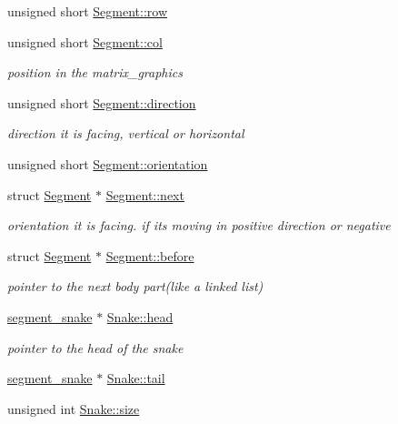 \begin{DoxyCompactItemize}
\item 
unsigned short \hyperlink{group__snake_ga5c86edfec316ae4d5033a85525babed6}{Segment\+::row}
\item 
unsigned short \hyperlink{group__snake_ga3369387554e0ec37bb04c153c3529ed9}{Segment\+::col}
\begin{DoxyCompactList}\small\item\em position in the matrix\+\_\+graphics \end{DoxyCompactList}\item 
unsigned short \hyperlink{group__snake_gacf610091b7f59fb0f1f37c6df4e14c18}{Segment\+::direction}
\begin{DoxyCompactList}\small\item\em direction it is facing, vertical or horizontal \end{DoxyCompactList}\item 
unsigned short \hyperlink{group__snake_gadd6c62d3fd2c3aab9175c07694fdc075}{Segment\+::orientation}
\item 
struct \hyperlink{structSegment}{Segment} $\ast$ \hyperlink{group__snake_ga20fb1741f720a656ec35972c2305a2d9}{Segment\+::next}
\begin{DoxyCompactList}\small\item\em orientation it is facing. if its moving in positive direction or negative \end{DoxyCompactList}\item 
struct \hyperlink{structSegment}{Segment} $\ast$ \hyperlink{group__snake_ga60c4d032ff0baffc3c99c1630dae24e3}{Segment\+::before}
\begin{DoxyCompactList}\small\item\em pointer to the next body part(like a linked list) \end{DoxyCompactList}\item 
\hyperlink{group__snake_ga40f634d31a1f9372bd182d65da207a21}{segment\+\_\+snake} $\ast$ \hyperlink{group__snake_gaf63e50ac65f365d67ae3975a178cba8c}{Snake\+::head}
\begin{DoxyCompactList}\small\item\em pointer to the head of the snake \end{DoxyCompactList}\item 
\hyperlink{group__snake_ga40f634d31a1f9372bd182d65da207a21}{segment\+\_\+snake} $\ast$ \hyperlink{group__snake_gada92e10f60af5b1afdb7318df07a1a33}{Snake\+::tail}
\item 
unsigned int \hyperlink{group__snake_ga29ba822024f7651a9fa0c80df840252b}{Snake\+::size}

\end{DoxyCompactItemize}
